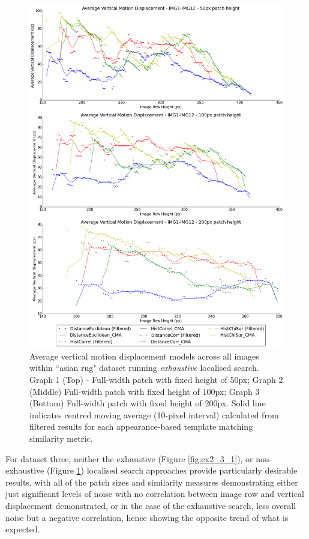 \clearpage
\begin{figure}[ht!]
\centering
\includegraphics[scale=0.3]{images/results/wiltshire_inside_10cm_non_scaled_exhaustive}
\caption{Average vertical motion displacement models across all images within ``asian rug" dataset running \textit{exhaustive} localised search. Graph 1 (Top) - Full-width patch with fixed height of 50px; Graph 2 (Middle) Full-width patch with fixed height of 100px; Graph 3 (Bottom) Full-width patch with fixed height of 200px. Solid line indicates centred moving average (10-pixel interval) calculated from filtered results for each appearance-based template matching similarity metric.}
\label{fig:ex2_3_2}
\end{figure}

For dataset three, neither the exhaustive (Figure \ref{fig:ex2_3_1}), or non-exhaustive (Figure \ref{fig:ex2_3_2}) localised search approaches provide particularly desirable results, with all of the patch sizes and similarity measures demonstrating either just significant levels of noise with no correlation between image row and vertical displacement demonstrated, or in the case of the exhaustive search, less overall noise but a negative correlation, hence showing the opposite trend of what is expected. 

